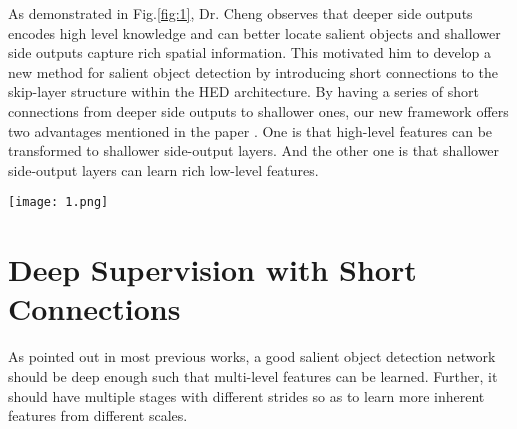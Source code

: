\documentclass[10pt,twocolumn,letterpaper]{article}
\begin{document}
As demonstrated in Fig.\ref{fig:1}, Dr. Cheng observes that deeper side outputs encodes high level knowledge and can better locate salient objects and shallower side outputs capture rich spatial information. This motivated him to develop a new method for salient object detection by introducing short connections to the skip-layer structure within the HED architecture. By having a series of short connections from deeper side outputs to shallower ones, our new framework offers two advantages mentioned in the paper \cite{Hou2016Deeply}. One is that high-level features can be transformed to shallower side-output layers. And the other one is that shallower side-output layers can learn rich low-level features.
\begin{figure*}
	\begin{center}
		\texttt{[image: 1.png]}
	\end{center}
	\caption{Visual comparison of saliency maps produced by the HED-based method and ours. Though saliency maps produced by deeper (4-6) side output (s-out) look similar, because of the introduced short connections, each shallower (1-3) side output can generate satisfactory saliency maps and hence a better output result.}
	\label{fig:1}
\end{figure*}

\section{Deep Supervision with Short Connections}

As pointed out in most previous works, a good salient object detection network should be deep enough such that multi-level features can be learned. Further, it should have multiple stages with different strides so as to learn more inherent features from different scales.
\end{document}
